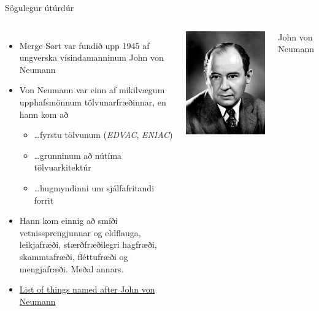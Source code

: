 \documentclass{beamer}
\begin{document}
\begin{frame}{Sögulegur útúrdúr}
\begin{columns}[c]
\begin{itemize}
 \item Merge Sort var fundið upp 1945 af ungverska vísindamanninum John von Neumann
 \item Von Neumann var einn af mikilvægum upphafsmönnum tölvunarfræðinnar, en hann kom að
 \begin{itemize}
  \item \ldots fyrstu tölvunum (\emph{EDVAC}, \emph{ENIAC})
  \item \ldots grunninum að nútíma tölvuarkitektúr
  \item \ldots hugmyndinni um sjálfafritandi forrit
 \end{itemize}
 \item Hann kom einnig að smíði vetnissprengjunnar og eldflauga, leikjafræði, stærðfræðilegri hagfræði, skammtafræði, fléttufræði og mengjafræði. Meðal annars.
 \item \href{http://en.wikipedia.org/wiki/List\_of\_things\_named\_after\_John\_von\_Neumann}{List of things named after John von Neumann}
\end{itemize}
\includegraphics[width=\textwidth]{Pics/john-von-neumann}

John von Neumann
\end{columns}
\end{frame}
\end{document}
